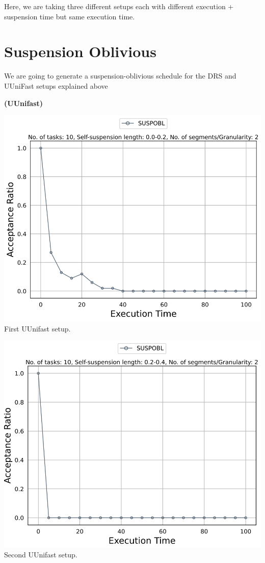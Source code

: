 \documentclass[]{article}
\begin{document}
{\raggedleft
Here, we are taking three different setups each with different execution + suspension time but same execution time.
}
	\clearpage

\section{Suspension Oblivious}

{
\raggedleft We are going to generate a suspension-oblivious schedule for the DRS and UUniFast setups explained above \newline
}
	
	\begin{minipage}[t]{0.48\linewidth}
		\centering
		\textbf{(UUnifast)}
		\vspace{0.3cm}
		
		\includegraphics[width=\linewidth]{Capture.png}
		First UUnifast setup.

  
		\vspace{0.3cm}
		
		\includegraphics[width=\linewidth]{Capture2_uunifast.png}
		Second UUnifast setup.
		\vspace{0.3cm}
		

\end{minipage}
\end{document}

